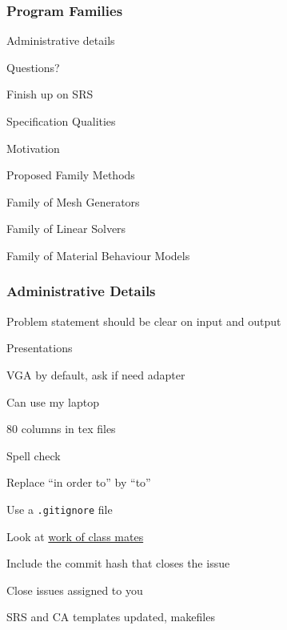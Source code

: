 \documentclass[t,12pt,numbers,fleqn]{beamer}
\newcounter{temp}
\begin{document}



\begin{frame}
\frametitle{Program Families}

\bi
\item Administrative details
\item Questions?
\item Finish up on SRS
\item Specification Qualities
\item Motivation
\item Proposed Family Methods
\item Family of Mesh Generators
\item Family of Linear Solvers
\item Family of Material Behaviour Models
\ei
\end{frame}


\begin{frame}
\frametitle{Administrative Details}

\bi
\item Problem statement should be clear on input and output
\item Presentations
\bi
\item VGA by default, ask if need adapter
\item Can use my laptop
\ei
\item 80 columns in tex files
\item Spell check
\item Replace ``in order to'' by ``to''
\item Use a \texttt{.gitignore} file
\item Look at
  \href{https://gitlab.cas.mcmaster.ca/smiths/cas741/blob/master/Repos.xlsx}{work
    of class mates}
\item Include the commit hash that closes the issue
\item Close issues assigned to you
\item SRS and CA templates updated, makefiles
\ei

\end{frame}
\end{document}
